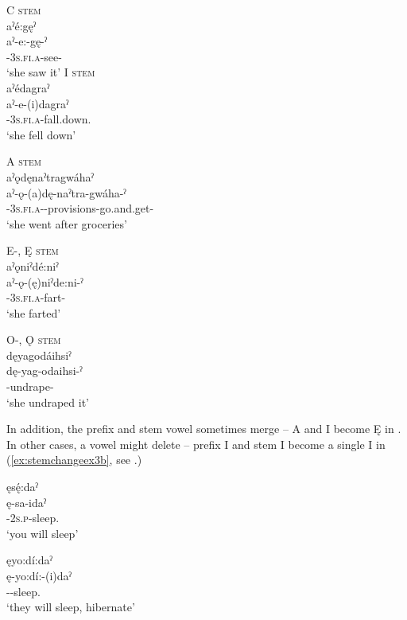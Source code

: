 \ea\label{ex:pronprefpronchangesex} 
\ea \textsc{C stem} \\\label{ex:pronprefpronchangesexa}
 aˀé:gęˀ\\
\gll aˀ-e:-gę-ˀ\\
{\factual}-\textsc{3s.fi.a}-see-{\punctual}\\
\glt  ‘she saw it’
\clearpage 
\ex \textsc{I stem} \\\label{ex:pronprefpronchangesexb}
aˀédagraˀ\\
\gll aˀ-e-(i)dagraˀ\\
{\factual}-\textsc{3s.fi.a}-fall.down.{\punctual}\\
\glt  ‘she fell down’

\ex \textsc{A stem} \\\label{ex:pronprefpronchangesexc}
 aˀǫdęnaˀtragwáhaˀ\\
\gll aˀ-ǫ-(a)dę-naˀtra-gwáha-ˀ\\
{\factual}-\textsc{3s.fi.a}-{\semireflexive}-provisions-go.and.get-{\punctual}\\
\glt  ‘she went after groceries’

\ex \textsc{E-, Ę stem}\\\label{ex:pronprefpronchangesexd}
 aˀǫniˀdé:niˀ\\
\gll aˀ-ǫ-(ę)niˀde:ni-ˀ \\
{\factual}-\textsc{3s.fi.a}-fart-{\punctual}\\
\glt  ‘she farted’

\ex \textsc{O-, Ǫ stem} \\\label{ex:pronprefpronchangesexe}
dęyagodáihsiˀ\\
\gll dę-yag-odaihsi-ˀ\\
{\dualicfuture}-undrape-{\punctual}\\
\glt  ‘she undraped it’
\z
\z

In addition, the prefix and stem vowel sometimes merge -- A and I become Ę in . In other cases, a vowel might delete -- prefix I and stem I become a single I in (\ref{ex:stemchangeex3b}, see .)

\ea\label{ex:stemchangeex3}
\ea ęsę́:daˀ\\\label{ex:stemchangeex3a}
\gll ę-sa-idaˀ\\
 \fut-\textsc{2s.p}-sleep.{\punctual}\\
\glt `you will sleep'

\ex ęyo:dí:daˀ\\\label{ex:stemchangeex3b}
\gll ę-yo:dí:-(i)daˀ\\
 \fut--sleep.{\punctual}\footnotemark{}\\
\glt `they will sleep, hibernate'
\z
\z


